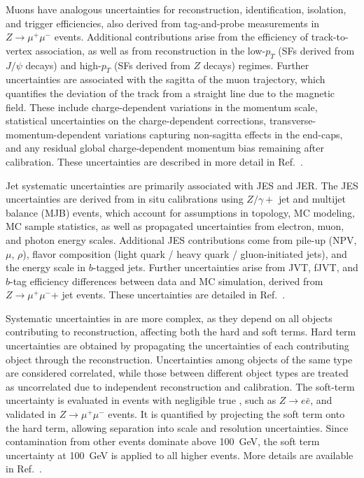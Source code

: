 Muons have analogous uncertainties for reconstruction, identification, isolation, and trigger efficiencies, also derived from tag-and-probe measurements in $Z \to \mu^{+}\mu^{-}$ events. Additional contributions arise from the efficiency of track-to-vertex association, as well as from reconstruction in the low-$p_T$ (SFs derived from $J/\psi$ decays) and high-$p_T$ (SFs derived from $Z$ decays) regimes. Further uncertainties are associated with the sagitta of the muon trajectory, which quantifies the deviation of the track from a straight line due to the magnetic field. These include charge-dependent variations in the momentum scale, statistical uncertainties on the charge-dependent corrections, transverse-momentum-dependent variations capturing non-sagitta effects in the end-caps, and any residual global charge-dependent momentum bias remaining after calibration. These uncertainties are described in more detail in Ref.~\cite{ATLAS:2020auj}.

Jet systematic uncertainties are primarily associated with JES and JER\@. The JES uncertainties are derived from in situ calibrations using $Z/\gamma+$ jet and multijet balance (MJB) events, which account for assumptions in topology, MC modeling, MC sample statistics, as well as propagated uncertainties from electron, muon, and photon energy scales. Additional JES contributions come from pile-up (NPV, $\mu$, $\rho$), flavor composition (light quark / heavy quark / gluon-initiated jets), and the energy scale in $b$-tagged jets. Further uncertainties arise from JVT, fJVT, and $b$-tag efficiency differences between data and MC simulation, derived from $Z\to \mu^{+}\mu^{-}$+ jet events. These uncertainties are detailed in Ref.~\cite{ATLAS:2017bje}.

Systematic uncertainties in \met{} are more complex, as they depend on all objects contributing to \met{} reconstruction, affecting both the hard and soft terms. Hard term uncertainties are obtained by propagating the uncertainties of each contributing object through the \met{} reconstruction. Uncertainties among objects of the same type are considered correlated, while those between different object types are treated as uncorrelated due to independent reconstruction and calibration. The soft-term uncertainty is evaluated in events with negligible true \met{}, such as $Z\to e\bar{e}$, and validated in $Z\to \mu^{+}\mu^{-}$ events. It is quantified by projecting the soft term onto the hard term, allowing separation into scale and resolution uncertainties. Since contamination from other events dominate above 100~GeV, the soft term uncertainty at 100~GeV is applied to all higher \pt{} events. More details are available in Ref.~\cite{ATLAS:2024cmj}.

